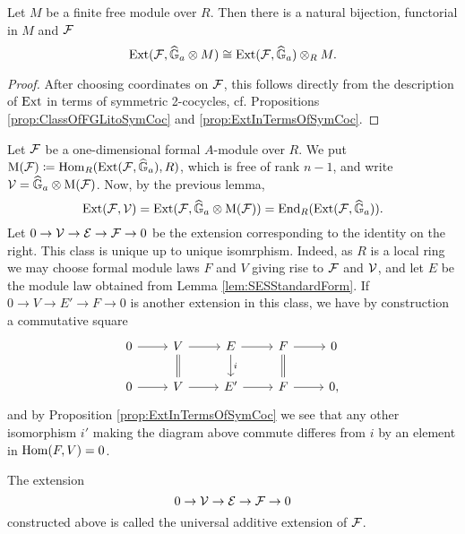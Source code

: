 \documentclass[../main.tex]{subfiles}
\begin{document}
\begin{lem}
  Let $M$ be a finite free module over $R$. Then there is a natural bijection,
  functorial in $M$ and $\mathcal{F}$
  \begin{equation*}
    \operatorname{Ext}(\mathcal{F}, \widehat{\mathbb{G}}_a \otimes M) \cong \operatorname{Ext}(\mathcal{F}, \widehat{\mathbb{G}}_a) \otimes_R M.
  \end{equation*}
\begin{proof}
  After choosing coordinates on $\mathcal{F}$, this follows directly from the 
  description of $\operatorname{Ext}$ in terms of symmetric 2-cocycles, cf. Propositions
  \ref{prop:ClassOfFGLitoSymCoc} and \ref{prop:ExtInTermsOfSymCoc}.
\end{proof}
\end{lem}

Let $\mathcal{F}$ be a one-dimensional formal $A$-module over $R$.
We put $\mathrm M(\mathcal{F}) \coloneqq \operatorname{Hom}_R(\operatorname{Ext}(\mathcal{F}, \widehat{\mathbb{G}}_a), R)$, which is free of
rank $n-1$, and
write $\mathcal{V} = \widehat{\mathbb{G}}_a \otimes \mathrm M(\mathcal{F})$. Now, by the previous lemma,
\begin{equation*}
  \operatorname{Ext}(\mathcal{F},\mathcal{V}) = \operatorname{Ext}(\mathcal{F}, \widehat{\mathbb{G}}_a \otimes \mathrm M(\mathcal{F})) = \operatorname{End}_R(\operatorname{Ext}(\mathcal{F}, \widehat{\mathbb{G}}_a)). 
\end{equation*}
Let $0 \to \mathcal{V} \to \mathcal{E} \to \mathcal{F} \to 0$ be the extension corresponding to the identity 
on the right. This class is unique up to unique isomrphism. Indeed, 
as $R$ is a local ring we may choose formal module laws $F$ and $V$ giving rise
to $\mathcal{F}$ and $\mathcal{V}$, and let $E$ be the module law obtained from 
Lemma \ref{lem:SESStandardForm}. 
If $0 \to V \to E' \to F \to 0$ is another extension in this class, we
have by construction a commutative square
\begin{equation*}
\begin{tikzcd}[ampersand replacement=\&]
	0 \& {V} \& E \& F \& 0 \\
	0 \& {V} \& {E'} \& F \& 0,
	\arrow[from=1-1, to=1-2]
	\arrow[from=1-2, to=1-3]
	\arrow[Rightarrow, no head, from=1-2, to=2-2]
	\arrow[from=1-3, to=1-4]
	\arrow["i", from=1-3, to=2-3]
	\arrow[from=1-4, to=1-5]
	\arrow[Rightarrow, no head, from=1-4, to=2-4]
	\arrow[from=2-1, to=2-2]
	\arrow[from=2-2, to=2-3]
	\arrow[from=2-3, to=2-4]
	\arrow[from=2-4, to=2-5]
\end{tikzcd}
\end{equation*}
and by Proposition \ref{prop:ExtInTermsOfSymCoc} we see that 
any other isomorphism $i'$ making the diagram above commute differes from
$i$ by an element in $\operatorname{Hom}(F, V) = 0$. 

\begin{defi}
  The extension
  \begin{equation*}
    0 \to \mathcal{V} \to \mathcal{E} \to \mathcal{F} \to 0
  \end{equation*}
  constructed above is called the universal additive extension of $\mathcal{F}$.
\end{defi}
\end{document}
